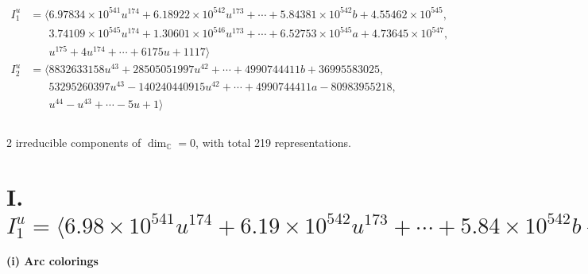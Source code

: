 \documentclass[1p]{elsarticle_modified}
\theoremstyle{definition}
\begin{document}
\begin{align*}
I^u_{1}&=\langle 
6.97834\times10^{541} u^{174}+6.18922\times10^{542} u^{173}+\cdots+5.84381\times10^{542} b+4.55462\times10^{545},\\
\phantom{I^u_{1}}&\phantom{= \langle  }3.74109\times10^{545} u^{174}+1.30601\times10^{546} u^{173}+\cdots+6.52753\times10^{545} a+4.73645\times10^{547},\\
\phantom{I^u_{1}}&\phantom{= \langle  }u^{175}+4 u^{174}+\cdots+6175 u+1117\rangle \\
I^u_{2}&=\langle 
8832633158 u^{43}+28505051997 u^{42}+\cdots+4990744411 b+36995583025,\\
\phantom{I^u_{2}}&\phantom{= \langle  }53295260397 u^{43}-140240440915 u^{42}+\cdots+4990744411 a-80983955218,\\
\phantom{I^u_{2}}&\phantom{= \langle  }u^{44}- u^{43}+\cdots-5 u+1\rangle \\
\\
\end{align*}
\raggedright * 2 irreducible components of $\dim_{\mathbb{C}}=0$, with total 219 representations.\\
\newpage
\renewcommand{\arraystretch}{1}
\centering \section*{I. $I^u_{1}= \langle 6.98\times10^{541} u^{174}+6.19\times10^{542} u^{173}+\cdots+5.84\times10^{542} b+4.55\times10^{545},\;3.74\times10^{545} u^{174}+1.31\times10^{546} u^{173}+\cdots+6.53\times10^{545} a+4.74\times10^{547},\;u^{175}+4 u^{174}+\cdots+6175 u+1117 \rangle$}
\flushleft \textbf{(i) Arc colorings}\\
\end{document}
